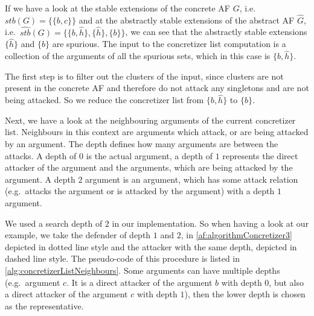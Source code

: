If we have a look at the stable extensions of the concrete AF $G$, i.e.\ 
$stb(G) = \bigl\{\{b, c\}\bigl\}$ and at the abstractly stable extensions of the abstract AF $\hat{G}$, i.e.\ 
$\hat{stb}(G) = \bigl\{\{b, \hat{h}\}, \{\hat{h}\}, \{b\}\bigl\}$, we can see that the abstractly stable extensions $\{\hat{h}\}$ and $\{b\}$ are spurious. The input to the concretizer list computation is a collection of the arguments of all the spurious sets, which in this case is $\{b, \hat{h}\}$.

The first step is to filter out the clusters of the input, since clusters are not present in the concrete AF and therefore do not attack any singletons and are not being attacked. So we reduce the concretizer list from $\{b, \hat{h}\}$ to $\{b\}$.

Next, we have a look at the neighbouring arguments of the current concretizer list.  Neighbours in this context are arguments which attack, or are being attacked by an argument. The depth defines how many arguments are between the attacks. A depth of $0$ is the actual argument, a depth of $1$ represents the direct attacker of the argument and the arguments, which are being attacked by the argument. A depth $2$ argument is an argument, which has some attack relation (e.g.\ attacks the argument or is attacked by the argument) with a depth $1$ argument.

We used a search depth of $2$ in our implementation. So when having a look at our example, we take the defender of depth $1$ and $2$, in \cref{af:algorithmConcretizer3} depicted in dotted line style and the attacker with the same depth, depicted in dashed line style. The pseudo-code of this procedure is listed in \cref{alg:concretizerListNeighbours}. Some arguments can have multiple depths (e.g.\ argument $c$. It is a direct attacker of the argument $b$ with depth $0$, but also a direct attacker of the argument $c$ with depth $1$), then the lower depth is chosen as the representative.

